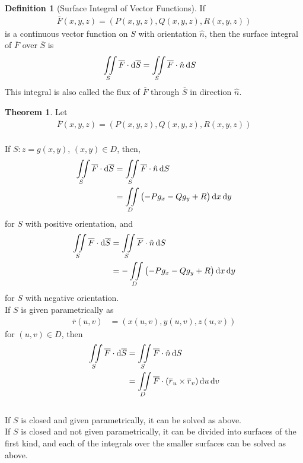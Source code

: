 \documentclass[fleqn, a4paper, 8pt, twoside]{amsart}
\theoremstyle{definition}
\theoremstyle{bluedefinition}
\newtheorem{definition}{Definition}
\theoremstyle{redtheorem}
\newtheorem{theorem}{Theorem}
\begin{document}
\begin{multicols}{2}
\begin{spacing}{0.7}
\begin{definition}[Surface Integral of Vector Functions]
	If 
	\begin{align*}
		\overline{F}(x,y,z) = \left( P(x,y,z) , Q(x,y,z) , R(x,y,z) \right)
	\end{align*}
	is a continuous vector function on $S$ with orientation $\hat{n}$, then the surface integral of $\overline{F}$ over $\overline{S}$ is
	\begin{align*}
		\iint\limits_{S} \overline{F} \cdot \dif \overline{S} & = \iint\limits_{S} \overline{F} \cdot \hat{n} \dif S
	\end{align*}
	This integral is also called the flux of $\overline{F}$ through $\overline{S}$ in direction $\hat{n}$.
\end{definition}

\begin{theorem}
	Let
	\begin{align*}
		\overline{F}(x,y,z) = \left( P(x,y,z) , Q(x,y,z) , R(x,y,z) \right)
	\end{align*}
	~\\
	If $S : z = g(x,y)$, $(x,y) \in D$, then,
	\begin{align*}
		\iint\limits_{S} \overline{F} \cdot \dif \overline{S} & = \iint\limits_{S} \overline{F} \cdot \hat{n} \dif S \\
                                                                      & = \iint\limits_{D} \left( -P g_x - Q g_y + R \right) \dif x \dif y
	\end{align*}
	for $S$ with positive orientation, and
	\begin{align*}
		\iint\limits_{S} \overline{F} \cdot \dif \overline{S} & = \iint\limits_{S} \overline{F} \cdot \hat{n} \dif S \\
                                                                      & = -\iint\limits_{D} \left( -P g_x - Q g_y + R \right) \dif x \dif y
	\end{align*}
	for $S$ with negative orientation.
	~\\
	If $S$ is given parametrically as
	\begin{align*}
		\overline{r}(u,v) & = \left( x(u,v) , y(u,v) , z(u,v) \right)
	\end{align*}
	for $(u,v) \in D$, then
	\begin{align*}
		\iint\limits_{S} \overline{F} \cdot \dif \overline{S} & = \iint\limits_{S} \overline{F} \cdot \hat{n} \dif S \\
                                                                      & = \iint\limits_{D} \overline{F} \cdot \left( \overline{r}_u \times \overline{r}_v \right) \dif u \dif v
	\end{align*}
	~\\
	If $S$ is closed and given parametrically, it can be solved as above.\\
	If $S$ is closed and not given parametrically, it can be divided into surfaces of the first kind, and each of the integrals over the smaller surfaces can be solved as above.
\end{theorem}


\end{spacing}
\end{multicols}
\end{document}
